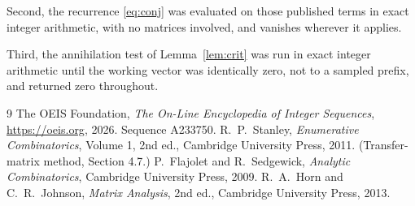 \documentclass[11pt,a4paper]{article}
\theoremstyle{plain}
\theoremstyle{definition}
\begin{document}
Second, the recurrence \eqref{eq:conj} was evaluated on those published terms in exact
integer arithmetic, with no matrices involved, and vanishes wherever it applies.

Third, the annihilation test of Lemma~\ref{lem:crit} was run in exact integer arithmetic
until the working vector was identically zero, not to a sampled prefix, and returned zero
throughout.

\begin{thebibliography}{9}
 The OEIS Foundation, \emph{The On-Line Encyclopedia of Integer
Sequences}, \url{https://oeis.org}, 2026. Sequence A233750.
 R.~P.~Stanley, \emph{Enumerative Combinatorics}, Volume 1, 2nd ed.,
Cambridge University Press, 2011. (Transfer-matrix method, Section 4.7.)
 P.~Flajolet and R.~Sedgewick, \emph{Analytic Combinatorics}, Cambridge
University Press, 2009.
 R.~A.~Horn and C.~R.~Johnson, \emph{Matrix Analysis}, 2nd ed., Cambridge
University Press, 2013.
\end{thebibliography}
\end{document}
